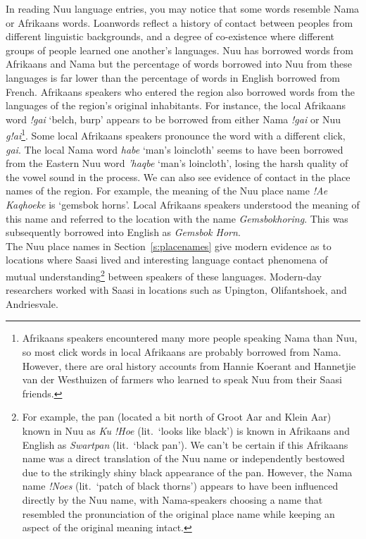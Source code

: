 In reading N\textipa{\textvertline}uu language entries, you may notice
that some words resemble Nama or Afrikaans words. Loanwords reflect a
history of contact between peoples from different linguistic
backgrounds, and a degree of co-existence where different groups of
people learned one another's languages. N\textipa{\textvertline}uu has
borrowed words from Afrikaans and Nama but the percentage of words
borrowed into N\textipa{\textvertline}uu from these languages is far
lower than the percentage of words in English borrowed from French.
Afrikaans speakers who entered the region also borrowed words from the
languages of the region's original inhabitants. For instance, the
local Afrikaans word \emph{!gai} `belch, burp' appears to be borrowed
from either Nama \emph{!gai} or N\textipa{\textvertline}uu
\emph{g!ai}\footnote{Afrikaans speakers encountered many more people
speaking Nama than N\textipa{\textvertline}uu, so most click words in
local Afrikaans are probably borrowed from Nama. However, there are
oral history accounts from Hannie Koerant and Hannetjie van der
Westhuizen of farmers who learned to speak N\textipa{\textvertline}uu
from their Saasi friends.}. Some local Afrikaans speakers pronounce
the word with a different click, \emph{\textipa{\textvertline}gai}.
The local Nama word \emph{\textipa{\textdoublebarpipe}habe} `man's
loincloth' seems to have been borrowed from the Eastern
N\textipa{\textvertline}uu word
\emph{\textipa{\textdoublebarpipe}'haqbe} `man's loincloth', losing
the harsh quality of the vowel sound in the process. We can also see
evidence of contact in the place names of the region. For example, the
meaning of the N\textipa{\textvertline}uu place name \emph{!Ae
Ka\textipa{\textdoublevertline}qhoeke} is `gemsbok horns'. Local
Afrikaans speakers understood the meaning of this name and referred to
the location with the name \emph{Gemsbokhoring}. This was subsequently
borrowed into English as \emph{Gemsbok Horn}.\\

The N\textipa{\textvertline}uu place names in
Section~\ref{s:placenames} give modern evidence as to locations where
Saasi lived and interesting language contact phenomena of mutual
understanding\footnote{For example, the pan (located a bit north of
Groot Aar and Klein Aar) known in N\textipa{\textvertline}uu as
\emph{Ku !Hoe} (lit.\ `looks like black') is known in Afrikaans and
English as \emph{Swartpan} (lit.\ `black pan'). We can't be certain if
this Afrikaans name was a direct translation of the
N\textipa{\textvertline}uu name or independently bestowed due to the
strikingly shiny black appearance of the pan. However, the Nama name
\emph{!Noes} (lit.\ `patch of black thorns') appears to have been
influenced directly by the N\textipa{\textvertline}uu name, with
Nama-speakers choosing a name that resembled the pronunciation of the
original place name while keeping an aspect of the original meaning
intact.} between speakers of these languages.  Modern-day researchers
worked with Saasi in locations such as Upington, Olifantshoek, and
Andriesvale.\\


